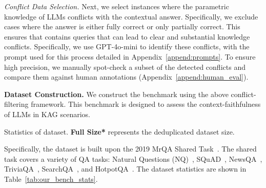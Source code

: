 \textit{Conflict Data Selection.} Next, we select instances where the parametric knowledge of LLMs conflicts with the contextual answer. Specifically, we exclude cases where the answer is either fully correct or only partially correct. This ensures that \dataset{} contains queries that can lead to clear and substantial knowledge conflicts. Specifically, we use GPT-4o-mini to identify these conflicts, with the prompt used for this process detailed in Appendix~\ref{append:prompts}. To ensure high precision, we manually spot-check a subset of the detected conflicts and compare them against human annotations (Appendix~\ref{append:human_eval}).


\textbf{\dataset{} Dataset Construction.}
We construct the \dataset{} benchmark using the above conflict-filtering framework. This benchmark is designed to assess the context-faithfulness of LLMs in KAG scenarios.

\begin{table}[t!]
    \centering
    
  \caption{Statistics of \dataset{} dataset. \textbf{Full Size*} represents the deduplicated dataset size.}
  \label{tab:our_bench_stats}
\end{table}

Specifically, the \dataset{} dataset is built upon the 2019 MrQA Shared Task~\cite{fisch2019mrqa}. The shared task covers a variety of QA tasks: Natural Questions (NQ)~\cite{kwiatkowski2019natural}, SQuAD~\cite{rajpurkar2016squad}, NewsQA~\cite{trischler2016newsqa}, TriviaQA~\cite{joshi2017triviaqa}, SearchQA~\cite{dunn2017searchqa}, and HotpotQA~\cite{yang2018hotpotqa}. The dataset statistics are shown in Table~\ref{tab:our_bench_stats}.




